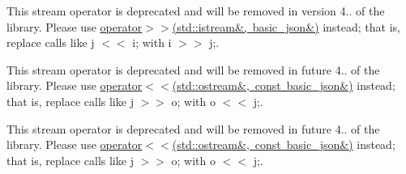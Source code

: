 \begin{DoxyRefList}
\label{deprecated__deprecated000006}%
%
This stream operator is deprecated and will be removed in version 4.. of the library. Please use \mbox{\hyperlink{classnlohmann_1_1basic__json_aaf363408931d76472ded14017e59c9e8}{operator$>$$>$(std\+::istream\&, basic\+\_\+json\&)}} instead; that is, replace calls like {\ttfamily j $<$$<$ i;} with {\ttfamily i $>$$>$ j;}.  
\item[Global \mbox{\hyperlink{classnlohmann_1_1basic__json_a34d6a60dd99e9f33b8273a1c8db5669b}{nlohmann\+::basic\+\_\+json$<$ Object\+Type, Array\+Type, String\+Type, Boolean\+Type, Number\+Integer\+Type, Number\+Unsigned\+Type, Number\+Float\+Type, Allocator\+Type, JSONSerializer $>$\+::operator$>$$>$}} (const \mbox{\hyperlink{classnlohmann_1_1basic__json}{basic\+\_\+json}} \&j, std\+::ostream \&o)]\label{deprecated__deprecated000002}%
%
This stream operator is deprecated and will be removed in future 4.. of the library. Please use \mbox{\hyperlink{classnlohmann_1_1basic__json_a5e34c5435e557d0bf666bd7311211405}{operator$<$$<$(std\+::ostream\&, const basic\+\_\+json\&)}} instead; that is, replace calls like {\ttfamily j $>$$>$ o;} with {\ttfamily o $<$$<$ j;}. 

\label{deprecated__deprecated000005}%
%
This stream operator is deprecated and will be removed in future 4.. of the library. Please use \mbox{\hyperlink{classnlohmann_1_1basic__json_a5e34c5435e557d0bf666bd7311211405}{operator$<$$<$(std\+::ostream\&, const basic\+\_\+json\&)}} instead; that is, replace calls like {\ttfamily j $>$$>$ o;} with {\ttfamily o $<$$<$ j;}. 
\end{DoxyRefList}